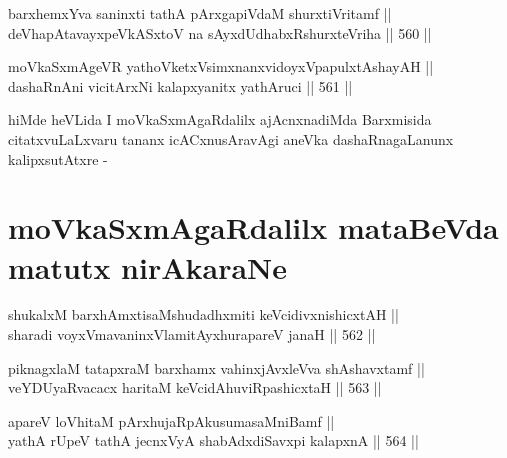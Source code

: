 \begin{shl}
barxhemxYva saninxti tathA pArxgapiVdaM shurxtiVritamf || \\
deVhapAtavayxpeVkASx\s toV na sAyxdUdhabxRshurxteVriha \hfill || 560 ||  
\end{shl}





\begin{shl}
moVkaSxmAgeVR yathoVketxV\s simxnanxvidoyxVpapulxtAshayAH || \\
dashaRnAni vicitArxNi kalapxyanitx yathAruci \hfill || 561 ||  
\end{shl}

\begin{artha}
hiMde heVLida I moVkaSxmAgaRdalilx ajAcnxnadiMda Barxmisida
citatxvuLaLxvaru tananx icACxnusAravAgi aneVka dashaRnagaLanunx
kalipxsutAtxre -
\end{artha}

\section*{moVkaSxmAgaRdalilx mataBeVda matutx nirAkaraNe}


\begin{shl}
shukalxM barxhAmxtisaMshudadhxmiti keVcidivxnishicxtAH || \\
sharadi voyxVmavaninxVlamitAyxhurapareV janaH \hfill || 562 ||  
\end{shl}

\begin{shl}
piknagxlaM tatapxraM barxhamx vahinxjAvxleVva shAshavxtamf || \\
veYDUyaRvacacx haritaM keVcidAhuviRpashicxtaH \hfill || 563 ||  
\end{shl}

\begin{shl}
apareV loVhitaM pArxhujaRpAkusumasaMniBamf || \\
yathA rUpeV tathA jecnxVyA shabAdxdiSavxpi kalapxnA \hfill || 564 ||  
\end{shl}

